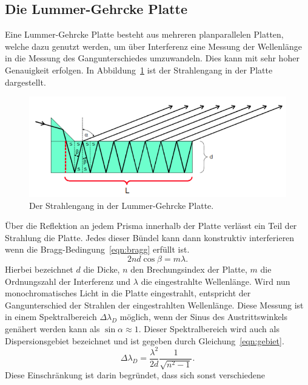 \subsection{Die Lummer-Gehrcke Platte}
\label{subsec:lummergehrcke}
Eine Lummer-Gehrcke Platte besteht aus mehreren planparallelen Platten, welche
dazu genutzt werden, um über Interferenz eine Messung der Wellenlänge in die
Messung des Gangunterschiedes umzuwandeln. Dies kann mit sehr hoher
Genauigkeit erfolgen. In Abbildung~\ref{fig:lummergehrcke} ist der Strahlengang
in der Platte dargestellt.
\begin{figure}[H]
  \centering
 \includegraphics[scale=0.5]{pictures/lummergehrcke.png}
 \caption{Der Strahlengang in der Lummer-Gehrcke Platte. \cite{Versuchsbeschreibung}}
 \label{fig:lummergehrcke}
\end{figure}
\noindent
Über die Reflektion an jedem Prisma innerhalb der Platte verlässt ein Teil der
Strahlung die Platte. Jedes dieser Bündel kann dann konstruktiv interferieren
wenn die Bragg-Bedingung~\ref{eqn:bragg} erfüllt ist.
\begin{equation}
 2 n d \cos{\beta} = m \lambda.
 \label{eqn:bragg}
\end{equation}
\noindent
Hierbei bezeichnet $d$ die Dicke, $n$ den Brechungsindex der Platte, $m$ die
Ordnungszahl der Interferenz und $\lambda$ die eingestrahlte Wellenlänge. Wird nun
monochromatisches Licht in die Platte eingestrahlt, entspricht der
Gangunterschied der Strahlen der eingestrahlten Wellenlänge. Diese Messung ist
in einem Spektralbereich $\Delta \lambda_{D}$ möglich, wenn der Sinus des Austrittswinkels
genähert werden kann als $\sin{\alpha} \approx 1$. Dieser Spektralbereich wird auch als
Dispersionsgebiet bezeichnet und ist gegeben durch Gleichung~\ref{eqn:gebiet}\cite{Versuchsbeschreibung}.
\begin{equation}
 \Delta \lambda_{D} = \frac{\lambda^{2}}{2d} \frac{1}{\sqrt{n^{2}-1}}.
 \label{eqn:gebiet}
\end{equation}
Diese Einschränkung ist darin begründet, dass sich sonst verschiedene
